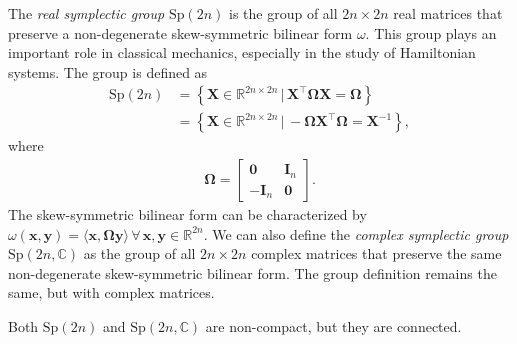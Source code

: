 \begin{example}\label{ex:symplectic-group}
    The \emph{real symplectic group} $\text{Sp}(2n)$ is the group of all $2n\times 2n$ real matrices that preserve a non-degenerate skew-symmetric bilinear form  $\omega$. This group plays an important role in classical mechanics, especially in the study of Hamiltonian systems. The group is defined as
    \begin{align}
        \text{Sp}(2n) &= \left\{\mathbf{X}\in\mathbb{R}^{2n\times 2n} \,|\, \mathbf{X}^\top\boldsymbol{\Omega}\mathbf{X} = \boldsymbol{\Omega}\right\}\\
        &= \left\{\mathbf{X}\in\mathbb{R}^{2n\times 2n} \,|\, -\boldsymbol{\Omega}\mathbf{X}^\top\boldsymbol{\Omega} = \mathbf{X}^{-1}\right\},
    \end{align}
    where 
    \begin{align}
        \boldsymbol{\Omega} = \begin{bmatrix}
            \mathbf{0} & \mathbf{I}_n\\
            -\mathbf{I}_n & \mathbf{0}
        \end{bmatrix}.
    \end{align}
    The skew-symmetric bilinear form can be characterized by $\omega(\mathbf{x},\mathbf{y})=\langle \mathbf{x}, \boldsymbol{\Omega}\mathbf{y}\rangle\,\forall\,\mathbf{x},\mathbf{y}\in\mathbb{R}^{2n}$. We can also define the \emph{complex symplectic group} $\text{Sp}(2n, \mathbb{C})$ as the group of all $2n\times 2n$ complex matrices that preserve the same non-degenerate skew-symmetric bilinear form. The group definition remains the same, but with complex matrices.

    Both $\text{Sp}(2n)$ and $\text{Sp}(2n, \mathbb{C})$ are non-compact, but they are connected.
\end{example}
